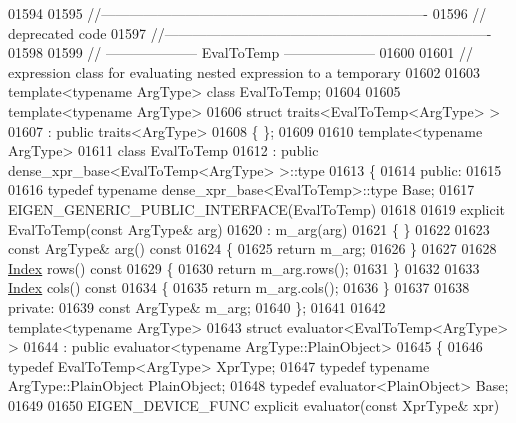 \begin{DoxyCode}
01594 
01595 \textcolor{comment}{//----------------------------------------------------------------------}
01596 \textcolor{comment}{// deprecated code}
01597 \textcolor{comment}{//----------------------------------------------------------------------}
01598 
01599 \textcolor{comment}{// -------------------- EvalToTemp --------------------}
01600 
01601 \textcolor{comment}{// expression class for evaluating nested expression to a temporary}
01602 
01603 \textcolor{keyword}{template}<\textcolor{keyword}{typename} ArgType> \textcolor{keyword}{class }EvalToTemp;
01604 
01605 \textcolor{keyword}{template}<\textcolor{keyword}{typename} ArgType>
01606 \textcolor{keyword}{struct }traits<EvalToTemp<ArgType> >
01607   : \textcolor{keyword}{public} traits<ArgType>
01608 \{ \};
01609 
01610 \textcolor{keyword}{template}<\textcolor{keyword}{typename} ArgType>
01611 \textcolor{keyword}{class }EvalToTemp
01612   : \textcolor{keyword}{public} dense\_xpr\_base<EvalToTemp<ArgType> >::type
01613 \{
01614  \textcolor{keyword}{public}:
01615  
01616   \textcolor{keyword}{typedef} \textcolor{keyword}{typename} dense\_xpr\_base<EvalToTemp>::type Base;
01617   EIGEN\_GENERIC\_PUBLIC\_INTERFACE(EvalToTemp)
01618  
01619   \textcolor{keyword}{explicit} EvalToTemp(\textcolor{keyword}{const} ArgType& arg)
01620     : m\_arg(arg)
01621   \{ \}
01622  
01623   \textcolor{keyword}{const} ArgType& arg()\textcolor{keyword}{ const}
01624 \textcolor{keyword}{  }\{
01625     \textcolor{keywordflow}{return} m\_arg;
01626   \}
01627 
01628   \hyperlink{namespace_eigen_a62e77e0933482dafde8fe197d9a2cfde}{Index} rows()\textcolor{keyword}{ const }
01629 \textcolor{keyword}{  }\{
01630     \textcolor{keywordflow}{return} m\_arg.rows();
01631   \}
01632 
01633   \hyperlink{namespace_eigen_a62e77e0933482dafde8fe197d9a2cfde}{Index} cols()\textcolor{keyword}{ const }
01634 \textcolor{keyword}{  }\{
01635     \textcolor{keywordflow}{return} m\_arg.cols();
01636   \}
01637 
01638  \textcolor{keyword}{private}:
01639   \textcolor{keyword}{const} ArgType& m\_arg;
01640 \};
01641  
01642 \textcolor{keyword}{template}<\textcolor{keyword}{typename} ArgType>
01643 \textcolor{keyword}{struct }evaluator<EvalToTemp<ArgType> >
01644   : \textcolor{keyword}{public} evaluator<typename ArgType::PlainObject>
01645 \{
01646   \textcolor{keyword}{typedef} EvalToTemp<ArgType>                   XprType;
01647   \textcolor{keyword}{typedef} \textcolor{keyword}{typename} ArgType::PlainObject         PlainObject;
01648   \textcolor{keyword}{typedef} evaluator<PlainObject> Base;
01649   
01650   EIGEN\_DEVICE\_FUNC \textcolor{keyword}{explicit} evaluator(\textcolor{keyword}{const} XprType& xpr)

\end{DoxyCode}

